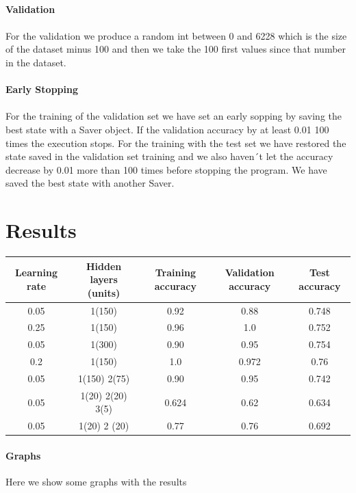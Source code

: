 \documentclass[a4paper]{report}
\begin{document}
\paragraph{Validation}
\paragraph{}For the validation we produce a random int between 0 and 6228 which is the size of the dataset minus 100 and then we take the 100 first values since that number in the dataset. 
\paragraph{Early Stopping}
\paragraph{}For the training of the validation set we have set an early sopping by saving the best state with a Saver object. If the validation accuracy by at least 0.01 100 times the execution stops. For the training with the test set we have restored the state saved in the validation set training and we also haven´t let the accuracy decrease by 0.01 more than 100 times before stopping the program. We have saved the best state with another Saver. 
\section{Results}
\begin{center}
\begin{tabular}{||c|c|c|c|c||}
\hline
 Learning rate & Hidden layers (units) & Training accuracy & Validation accuracy & Test accuracy  \\ [0.5ex]
\hline
\hline
0.05&1(150)&0.92&0.88&0.748\\
\hline
0.25&1(150)&0.96&1.0&0.752\\
\hline
0.05&1(300)&0.90&0.95&0.754\\
\hline
0.2&1(150)&1.0&0.972&0.76\\
\hline
0.05&1(150) 2(75)&0.90&0.95&0.742\\
\hline
0.05&1(20) 2(20) 3(5)&0.624&0.62&0.634\\
\hline
0.05&1(20) 2 (20)&0.77&0.76&0.692\\
\hline
\end{tabular}
\end{center}
\paragraph{Graphs}
Here we show some graphs with the results
\end{document}
